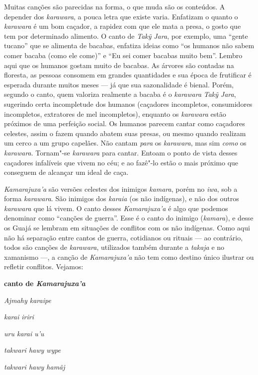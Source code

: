 Muitas canções são parecidas na forma, o que muda são os conteúdos. A
depender dos \emph{karawara}, a pouca letra que existe varia. Enfatizam
o quanto o \emph{karawara} é um bom caçador, a rapidez com que ele mata
a presa, o gosto que tem por determinado alimento. O canto de
\emph{Takỹ} \emph{Jara}, por exemplo, uma ``gente tucano'' que se
alimenta de bacabas, enfatiza ideias como ``os humanos não sabem comer
bacaba (como ele come)'' e ``Eu sei comer bacabas muito bem''. Lembro
aqui que os humanos gostam muito de bacabas. As árvores são contadas na
floresta, as pessoas consomem em grandes quantidades e sua época de
frutificar é esperada durante muitos meses --- já que sua sazonalidade é
bienal. Porém, segundo o canto, quem valoriza realmente a bacaba é o
\emph{karawara} \emph{Takỹ} \emph{Jara}, sugerindo certa incompletude
dos humanos (caçadores incompletos, consumidores incompletos, extratores
de mel incompletos), enquanto os \emph{karawara} estão próximos de uma
perfeição social. Os humanos parecem cantar como caçadores celestes,
assim o fazem quando abatem suas presas, ou mesmo quando realizam um
cerco a um grupo capelães. Não cantam \emph{para} os \emph{karawara},
mas sim \emph{como} os \emph{karawara}. Tornam"-se \emph{karawara} para
cantar. Entoam o ponto de vista desses caçadores infalíveis que vivem no
céu; e ao fazê"-lo estão o mais próximo que conseguem de alcançar um
ideal de caça.

\emph{Kamarajuxa'a} são versões celestes dos inimigos \emph{kamara},
porém no \emph{iwa}, sob a forma \emph{karawara}. São inimigos dos
\emph{karaia} (os não indígenas), e não dos outros \emph{karawara} que
lá vivem. O canto desses \emph{Kamarajuxa'a} é algo que podemos
denominar como ``canções de guerra''. Esse é o canto do inimigo
(\emph{kamara}), e desse os Guajá se lembram em situações de conflitos
com os não indígenas. Como aqui não há separação entre cantos de guerra,
cotidianos ou rituais --- ao contrário, todos são canções de
\emph{karawara}, utilizados também durante a \emph{takaja} e no
xamanismo ---, a canção de \emph{Kamarajuxa'a} não tem como destino único
ilustrar ou refletir conflitos. Vejamos:

\textbf{canto de \emph{Kamarajuxa'a}}

\emph{Ajmahy karaipe}

\emph{karai iriri}

\emph{uru karai u'u}

\emph{takwari hawy wype}

\emph{takwari hawy hamãj}

